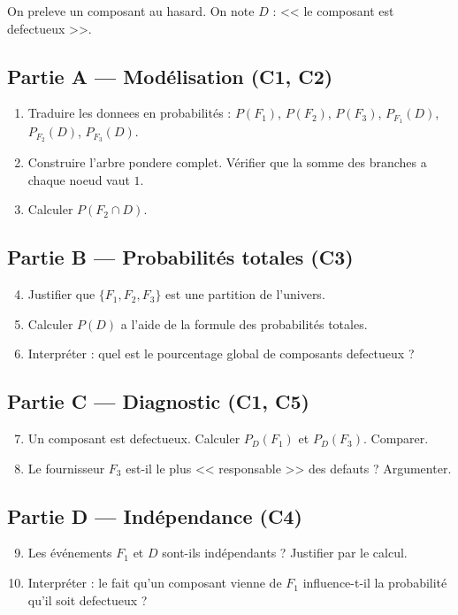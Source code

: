 On preleve un composant au hasard. On note $D$ : << le composant est defectueux >>.

\subsection*{Partie A --- Modélisation (C1, C2)}

\begin{enumerate}
  \item Traduire les donnees en probabilités : $P(F_1)$, $P(F_2)$, $P(F_3)$, $P_{F_1}(D)$, $P_{F_2}(D)$, $P_{F_3}(D)$.

  \item Construire l'arbre pondere complet. Vérifier que la somme des branches a chaque noeud vaut $1$.

  \item Calculer $P(F_2 \cap D)$.
\end{enumerate}

\subsection*{Partie B --- Probabilités totales (C3)}

\begin{enumerate}
  \setcounter{enumi}{3}
  \item Justifier que $\{F_1, F_2, F_3\}$ est une partition de l'univers.

  \item Calculer $P(D)$ a l'aide de la formule des probabilités totales.

  \item Interpréter : quel est le pourcentage global de composants defectueux ?
\end{enumerate}

\subsection*{Partie C --- Diagnostic (C1, C5)}

\begin{enumerate}
  \setcounter{enumi}{6}
  \item Un composant est defectueux. Calculer $P_D(F_1)$ et $P_D(F_3)$. Comparer.

  \item Le fournisseur $F_3$ est-il le plus << responsable >> des defauts ? Argumenter.
\end{enumerate}

\subsection*{Partie D --- Indépendance (C4)}

\begin{enumerate}
  \setcounter{enumi}{8}
  \item Les événements $F_1$ et $D$ sont-ils indépendants ? Justifier par le calcul.

  \item Interpréter : le fait qu'un composant vienne de $F_1$ influence-t-il la probabilité qu'il soit defectueux ?
\end{enumerate}
